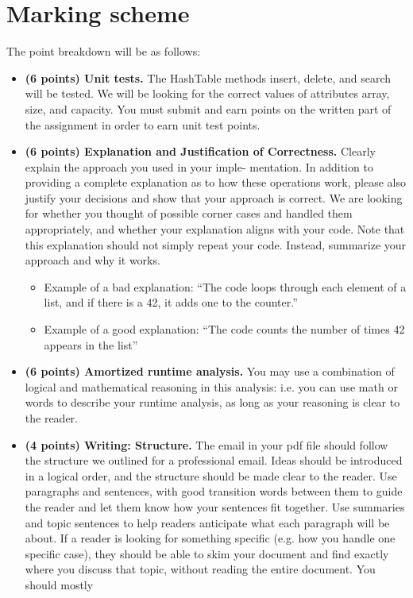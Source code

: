 \documentclass{article}
\begin{document}
\section*{Marking scheme}
The point breakdown will be as follows:
\begin{itemize}
	\item {\bf (6 points) Unit tests.} The HashTable methods insert, delete, and search will be tested. We will be looking for
the correct values of attributes array, size, and capacity. You must submit and earn points on the written
part of the assignment in order to earn unit test points.
	\item {\bf (6 points) Explanation and Justification of Correctness.} Clearly explain the approach you used in your imple-
mentation. In addition to providing a complete explanation as to how these operations work, please also justify your
decisions and show that your approach is correct. We are looking for whether you thought of possible corner cases and
handled them appropriately, and whether your explanation aligns with your code. Note that this explanation should
not simply repeat your code. Instead, summarize your approach and why it works.
\begin{itemize}
\item  Example of a bad explanation: “The code loops through each element of a list, and if there is a 42, it adds one to
the counter.”
\item Example of a good explanation: “The code counts the number of times 42 appears in the list”
\end{itemize}
	\item {\bf (6 points) Amortized runtime analysis.} You may use a combination of logical and mathematical reasoning in this
analysis: i.e. you can use math or words to describe your runtime analysis, as long as your reasoning is clear to the
reader.
\item {\bf (4 points) Writing: Structure.} The email in your pdf file should follow the structure we outlined for a professional
email. Ideas should be introduced in a logical order, and the structure should be made clear to the reader. Use
paragraphs and sentences, with good transition words between them to guide the reader and let them know how your
sentences fit together. Use summaries and topic sentences to help readers anticipate what each paragraph will be about.
If a reader is looking for something specific (e.g. how you handle one specific case), they should be able to skim your
document and find exactly where you discuss that topic, without reading the entire document. You should mostly

\end{itemize}
\end{document}
